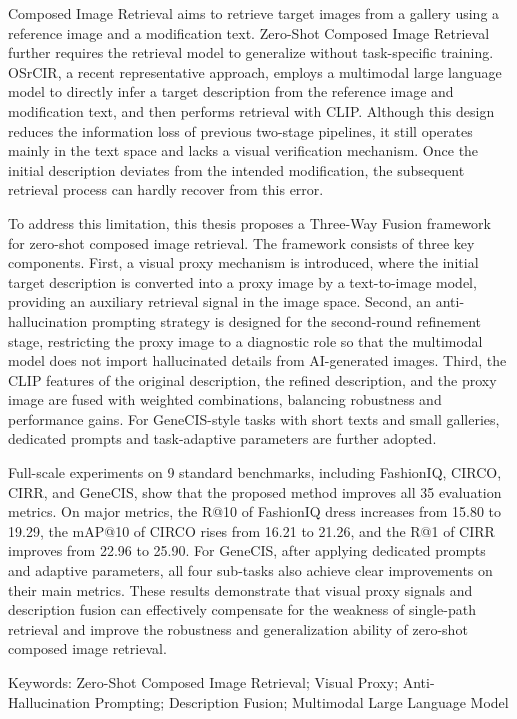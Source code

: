 \documentclass[12pt,a4paper,UTF8,oneside,openany]{ctexrep}
\begin{document}
Composed Image Retrieval aims to retrieve target images from a gallery
using a reference image and a modification text. Zero-Shot Composed
Image Retrieval further requires the retrieval model to generalize
without task-specific training. OSrCIR, a recent representative
approach, employs a multimodal large language model to directly infer a
target description from the reference image and modification text, and
then performs retrieval with CLIP. Although this design reduces the
information loss of previous two-stage pipelines, it still operates
mainly in the text space and lacks a visual verification mechanism. Once
the initial description deviates from the intended modification, the
subsequent retrieval process can hardly recover from this error.

To address this limitation, this thesis proposes a Three-Way Fusion
framework for zero-shot composed image retrieval. The framework consists
of three key components. First, a visual proxy mechanism is introduced,
where the initial target description is converted into a proxy image by
a text-to-image model, providing an auxiliary retrieval signal in the
image space. Second, an anti-hallucination prompting strategy is
designed for the second-round refinement stage, restricting the proxy
image to a diagnostic role so that the multimodal model does not import
hallucinated details from AI-generated images. Third, the CLIP features
of the original description, the refined description, and the proxy
image are fused with weighted combinations, balancing robustness and
performance gains. For GeneCIS-style tasks with short texts and small
galleries, dedicated prompts and task-adaptive parameters are further
adopted.

Full-scale experiments on 9 standard benchmarks, including FashionIQ,
CIRCO, CIRR, and GeneCIS, show that the proposed method improves all 35
evaluation metrics. On major metrics, the R@10 of FashionIQ dress
increases from 15.80 to 19.29, the mAP@10 of CIRCO rises from 16.21 to
21.26, and the R@1 of CIRR improves from 22.96 to 25.90. For GeneCIS,
after applying dedicated prompts and adaptive parameters, all four
sub-tasks also achieve clear improvements on their main metrics. These
results demonstrate that visual proxy signals and description fusion can
effectively compensate for the weakness of single-path retrieval and
improve the robustness and generalization ability of zero-shot composed
image retrieval.

Keywords: Zero-Shot Composed Image Retrieval; Visual Proxy;
Anti-Hallucination Prompting; Description Fusion; Multimodal Large
Language Model
\end{document}
